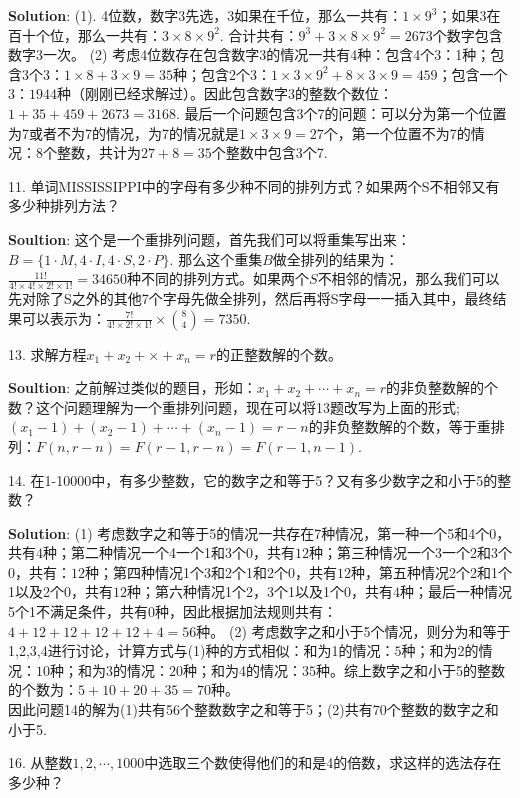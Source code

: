 \documentclass[a4paper]{ctexart}
\begin{document}
	\textbf{Solution}: (1). 4位数，数字3先选，3如果在千位，那么一共有：$1\times 9^3$；如果3在百十个位，那么一共有：$3\times 8\times 9^2$. 合计共有：$9^3+3\times 8\times 9^2=2673$个数字包含数字3一次。 (2) 考虑4位数存在包含数字3的情况一共有4种：包含4个3：1种；包含3个3：$1\times 8+3\times 9=35$种；包含2个3：$1\times 3\times 9^2 + 8\times 3\times 9=459$；包含一个3：$1944$种（刚刚已经求解过）。因此包含数字3的整数个数位：$1+35+459+2673=3168$. 最后一个问题包含3个7的问题：可以分为第一个位置为7或者不为7的情况，为7的情况就是$1\times 3\times 9=27$个，第一个位置不为7的情况：$8$个整数，共计为$27+8=35$个整数中包含3个7.
	
	11. 单词MISSISSIPPI中的字母有多少种不同的排列方式？如果两个S不相邻又有多少种排列方法？
	
	\textbf{Soultion}: 这个是一个重排列问题，首先我们可以将重集写出来：$B=\{1\cdot M, 4\cdot I, 4\cdot S,2\cdot P\}$. 那么这个重集$B$做全排列的结果为：$\frac{11!}{4!\times 4!\times 2!\times 1!}=34650$种不同的排列方式。如果两个$S$不相邻的情况，那么我们可以先对除了S之外的其他7个字母先做全排列，然后再将S字母一一插入其中，最终结果可以表示为：$\frac{7!}{4!\times 2!\times 1!}\times \binom{8}{4}=7350$.
	
	13. 求解方程$x_1+x_2+\times +x_n=r$的正整数解的个数。
	
	\textbf{Soultion}: 之前解过类似的题目，形如：$x_1+x_2+\cdots +x_n=r$的非负整数解的个数？这个问题理解为一个重排列问题，现在可以将13题改写为上面的形式;$(x_1-1)+(x_2-1)+\cdots + (x_n-1)=r-n$的非负整数解的个数，等于重排列：$F(n,r-n)=F(r-1,r-n)=F(r-1,n-1)$. 
	
	14. 在1-10000中，有多少整数，它的数字之和等于5？又有多少数字之和小于5的整数？
	
	\textbf{Solution}: (1) 考虑数字之和等于5的情况一共存在7种情况，第一种一个5和4个0，共有$4$种；第二种情况一个4一个1和3个0，共有$12$种；第三种情况一个3一个2和3个0，共有：$12$种；第四种情况1个3和2个1和2个0，共有$12$种，第五种情况2个2和1个1以及2个0，共有$12$种；第六种情况1个2，3个1以及1个0，共有$4$种；最后一种情况5个1不满足条件，共有$0$种，因此根据加法规则共有：$4+12+12+12+12+4=56$种。
	(2) 考虑数字之和小于5个情况，则分为和等于1,2,3,4进行讨论，计算方式与(1)种的方式相似：和为1的情况：$5$种；和为2的情况：$10$种；和为3的情况：$20$种；和为4的情况：$35$种。综上数字之和小于5的整数的个数为：$5+10+20+35=70$种。\\
	因此问题14的解为(1)共有56个整数数字之和等于5；(2)共有70个整数的数字之和小于5.
	
	16. 从整数$1,2,\cdots,1000$中选取三个数使得他们的和是4的倍数，求这样的选法存在多少种？
	
\end{document}
